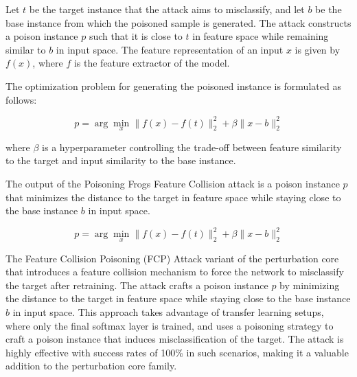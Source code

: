 Let \( t \) be the target instance that the attack aims to misclassify, and let \( b \) be the base instance from which the poisoned sample is generated. The attack constructs a poison instance \( p \) such that it is close to \( t \) in feature space while remaining similar to \( b \) in input space. The feature representation of an input \( x \) is given by \( f(x) \), where \( f \) is the feature extractor of the model.

The optimization problem for generating the poisoned instance is formulated as follows:

\[
p = \arg\min_x \|f(x) - f(t)\|_2^2 + \beta \|x - b\|_2^2
\]

where \( \beta \) is a hyperparameter controlling the trade-off between feature similarity to the target and input similarity to the base instance.

The output of the Poisoning Frogs Feature Collision attack is a poison instance $p$ that minimizes the distance to the target in feature space while staying close to the base instance $b$ in input space.

\begin{equation}
p = \arg\min_x \|f(x) - f(t)\|_2^2 + \beta \|x - b\|_2^2
\end{equation}

The Feature Collision Poisoning (FCP) Attack variant of the perturbation core that introduces a feature collision mechanism to force the network to misclassify the target after retraining. The attack crafts a poison instance $p$ by minimizing the distance to the target in feature space while staying close to the base instance $b$ in input space. This approach takes advantage of transfer learning setups, where only the final softmax layer is trained, and uses a poisoning strategy to craft a poison instance that induces misclassification of the target. The attack is highly effective with success rates of 100\% in such scenarios, making it a valuable addition to the perturbation core family.